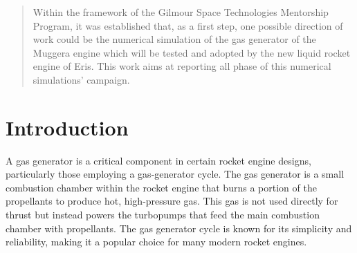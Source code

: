 \documentclass[12pt]{article}
\begin{document}

\begin{abstract}
\noindent Within the framework of the Gilmour Space Technologies Mentorship Program, it was established that, as a first step, one possible direction of work could be the numerical simulation of the gas generator of the Muggera engine which will be tested and adopted by the new liquid rocket engine of Eris. This work aims at reporting all phase of this numerical simulations' campaign.
\end{abstract}



\tableofcontents
\listoffigures
\listoftables

\section{Introduction}\label{sec:intro}
A gas generator is a critical component in certain rocket engine designs, particularly those employing a gas-generator cycle. The gas generator is a small combustion chamber within the rocket engine that burns a portion of the propellants to produce hot, high-pressure gas. This gas is not used directly for thrust but instead powers the turbopumps that feed the main combustion chamber with propellants. The gas generator cycle is known for its simplicity and reliability, making it a popular choice for many modern rocket engines.
\end{document}
